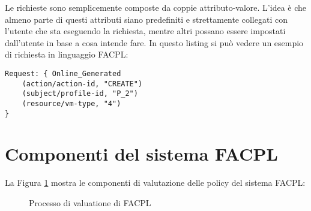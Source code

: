 Le richieste sono semplicemente composte da coppie attributo-valore. L'idea è che almeno parte di questi attributi siano predefiniti e strettamente collegati con l'utente che sta eseguendo la richiesta, mentre altri possano essere impostati dall'utente in base a cosa intende fare. In questo listing si può vedere un esempio di richiesta in linguaggio FACPL:
\begin{lstlisting}[xleftmargin=1em, label={code:requestFacpl}, caption={Esempio di richiesta in FACPL}, language=FACPL, basicstyle=\fontsize{9.5}{10}\ttfamily]
Request: { Online_Generated
    (action/action-id, "CREATE")
    (subject/profile-id, "P_2")
    (resource/vm-type, "4")
}
\end{lstlisting} 
\section{Componenti del sistema FACPL}
\label{sec:componentiFACPL}
La Figura \ref{fig:facplEvaluationProcess} mostra le componenti di valutazione delle policy del sistema FACPL:
\begin{figure}[h]
    \centering
    
    \caption{Processo di valuatione di FACPL}
    \label{fig:facplEvaluationProcess}
\end{figure}
